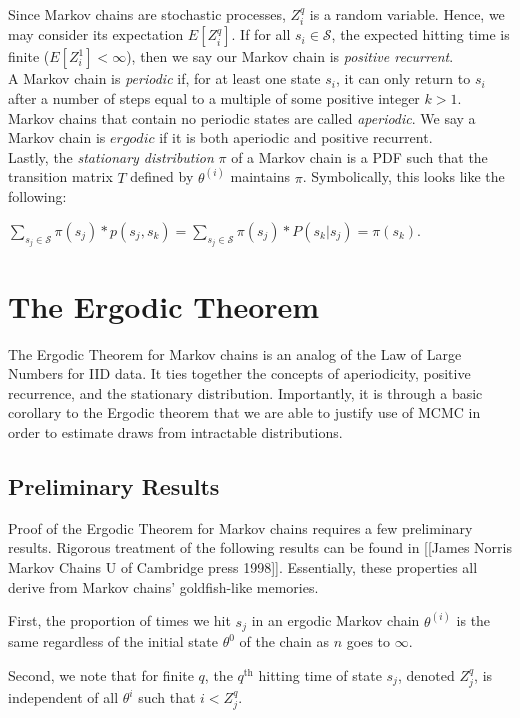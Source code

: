 \documentclass[12pt,twoside]{reedthesis}
\begin{document}
		Since Markov chains are stochastic processes, $Z^{q}_i$ is a random variable. Hence, we may consider its expectation $E[Z^{q}_i]$. If for all $s_i \in \mathcal S$, the expected hitting time is finite ($E[Z^{1}_i] < \infty$), then we say our Markov chain is {\em positive recurrent}. \\
		
		A Markov chain is {\em periodic} if, for at least one state $s_i$, it can only return to $s_i$ after a number of steps equal to a multiple of some positive integer $k > 1$. Markov chains that contain no periodic states are called {\em aperiodic}. We say a Markov chain is $ergodic$ if it is both aperiodic and positive recurrent. \\
		
		Lastly, the {\em stationary distribution} $\pi$ of a Markov chain is a PDF such that the transition matrix $T$ defined by $\theta^{(i)}$ maintains $\pi$. Symbolically, this looks like the following:
		\begin{center}
			$\displaystyle\sum_{s_j \in \mathcal S} \pi(s_j) * p(s_j,s_k) 
			= \displaystyle\sum_{s_j \in \mathcal S} \pi(s_j) * P(s_k | s_j)
			= \pi(s_k)$.
		\end{center}	
		\section{The Ergodic Theorem}
		The Ergodic Theorem for Markov chains is an analog of the Law of Large Numbers for IID data. It ties together the concepts of aperiodicity, positive recurrence, and the stationary distribution. Importantly, it is through a basic corollary to the Ergodic theorem that we are able to justify use of MCMC in order to estimate draws from intractable distributions.
		\subsection*{Preliminary Results}
		Proof of the Ergodic Theorem for Markov chains requires a few preliminary results. Rigorous treatment of the following results can be found in [[James Norris Markov Chains U of Cambridge press 1998]]. Essentially, these properties all derive from Markov chains' goldfish-like memories.
		
		First, the proportion of times we hit $s_j$ in an ergodic Markov chain $\theta^{(i)}$ is the same regardless of the initial state $\theta^0$ of the chain as $n$ goes to $\infty$. 
		
		Second, we note that for finite $q$, the $q^{\textrm{th}}$ hitting time of state $s_j$, denoted $Z^q_j$, is independent of all $\theta^{i}$ such that $i < {Z^q_j}$. 
		
\end{document}
